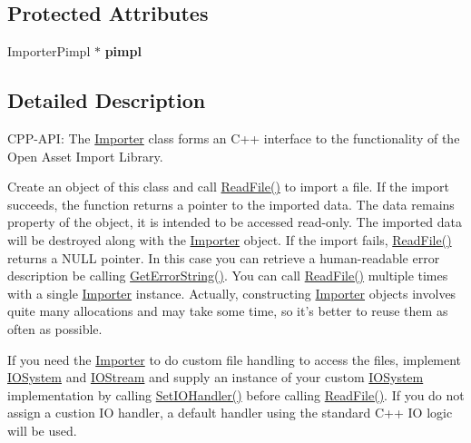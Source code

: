 \subsection*{Protected Attributes}
\begin{DoxyCompactItemize}
\item 
\hypertarget{class_assimp_1_1_importer_a3928bb8d375fd676dd5dbe33382e46ce}{Importer\+Pimpl $\ast$ {\bfseries pimpl}}\label{class_assimp_1_1_importer_a3928bb8d375fd676dd5dbe33382e46ce}

\end{DoxyCompactItemize}


\subsection{Detailed Description}
C\+P\+P-\/\+A\+P\+I\+: The \hyperlink{class_assimp_1_1_importer}{Importer} class forms an C++ interface to the functionality of the Open Asset Import Library.

Create an object of this class and call \hyperlink{class_assimp_1_1_importer_afa338a135a56956bd5deb7d238498dde}{Read\+File()} to import a file. If the import succeeds, the function returns a pointer to the imported data. The data remains property of the object, it is intended to be accessed read-\/only. The imported data will be destroyed along with the \hyperlink{class_assimp_1_1_importer}{Importer} object. If the import fails, \hyperlink{class_assimp_1_1_importer_afa338a135a56956bd5deb7d238498dde}{Read\+File()} returns a N\+U\+L\+L pointer. In this case you can retrieve a human-\/readable error description be calling \hyperlink{class_assimp_1_1_importer_ad6b2c203d69dd00708674c759485db1a}{Get\+Error\+String()}. You can call \hyperlink{class_assimp_1_1_importer_afa338a135a56956bd5deb7d238498dde}{Read\+File()} multiple times with a single \hyperlink{class_assimp_1_1_importer}{Importer} instance. Actually, constructing \hyperlink{class_assimp_1_1_importer}{Importer} objects involves quite many allocations and may take some time, so it's better to reuse them as often as possible.

If you need the \hyperlink{class_assimp_1_1_importer}{Importer} to do custom file handling to access the files, implement \hyperlink{class_assimp_1_1_i_o_system}{I\+O\+System} and \hyperlink{class_assimp_1_1_i_o_stream}{I\+O\+Stream} and supply an instance of your custom \hyperlink{class_assimp_1_1_i_o_system}{I\+O\+System} implementation by calling \hyperlink{class_assimp_1_1_importer_ac1c92d84d21c35dea6e5ad96a976c2ca}{Set\+I\+O\+Handler()} before calling \hyperlink{class_assimp_1_1_importer_afa338a135a56956bd5deb7d238498dde}{Read\+File()}. If you do not assign a custion I\+O handler, a default handler using the standard C++ I\+O logic will be used.

